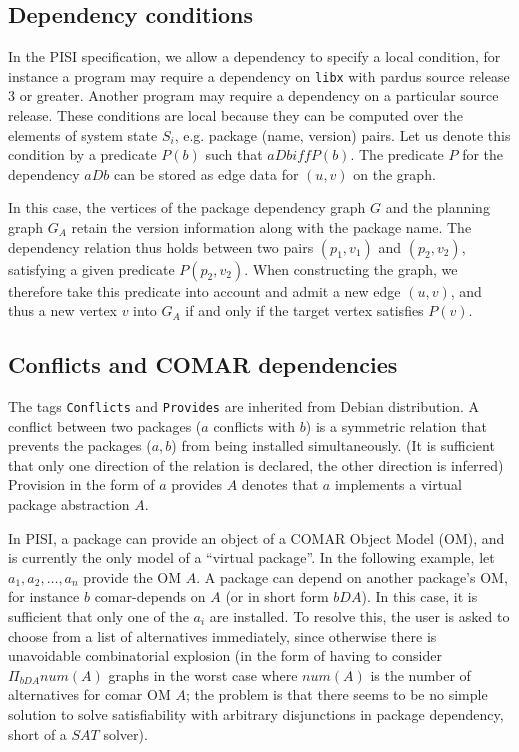 \documentclass[a4paper,11pt]{article}
\begin{document}
\subsection{Dependency conditions}

In the PISI specification, we allow a dependency to specify a local
condition, for instance a program may require a dependency on
\texttt{libx} with pardus source release $3$ or greater. Another
program may require a dependency on a particular source release. These
conditions are local because they can be computed over the elements of
system state $S_i$, e.g. package (name, version) pairs. Let us denote this
condition by a predicate $P(b)$ such that $aDb iff P(b)$.  The
predicate $P$ for the dependency $aDb$ can be stored as edge data for
$(u,v)$ on the graph.

In this case, the vertices of the package dependency graph $G$ and the
planning graph $G_A$ retain the version information along with the
package name. The dependency relation thus holds between two pairs
$(p_1,v_1)$ and $(p_2,v_2)$, satisfying a given predicate
$P(p_2,v_2)$. When constructing the graph, we therefore take this
predicate into account and admit a new edge $(u,v)$, and thus a new
vertex $v$ into $G_A$ if and only if the target vertex satisfies
$P(v)$.

\subsection{Conflicts and COMAR dependencies}

The tags \texttt{Conflicts} and \texttt{Provides} are inherited from
Debian distribution. A conflict between two packages ($a$ conflicts
with $b$) is a symmetric relation that prevents the packages ($a,b$)
from being installed simultaneously. (It is sufficient that only one
direction of the relation is declared, the other direction is
inferred) Provision in the form of $a$ provides $A$ denotes that $a$
implements a virtual package abstraction $A$.

In PISI, a package can provide an object of a COMAR Object Model (OM),
and is currently the only model of a ``virtual package''. In the
following example, let $a_1,a_2,\ldots,a_n$ provide the OM $A$. A package
can depend on another package's OM, for instance $b$ comar-depends on
$A$ (or in short form $bDA$). In this case, it is sufficient that only
one of the $a_i$ are installed. To resolve this, the user is asked to
choose from a list of alternatives immediately, since otherwise there
is unavoidable combinatorial explosion (in the form of having to
consider $\Pi_{bDA}num(A)$ graphs in the worst case where $num(A)$ is
the number of alternatives for comar OM $A$; the problem is that there
seems to be no simple solution to solve satisfiability with arbitrary
disjunctions in package dependency, short of a $SAT$ solver).
\end{document}
